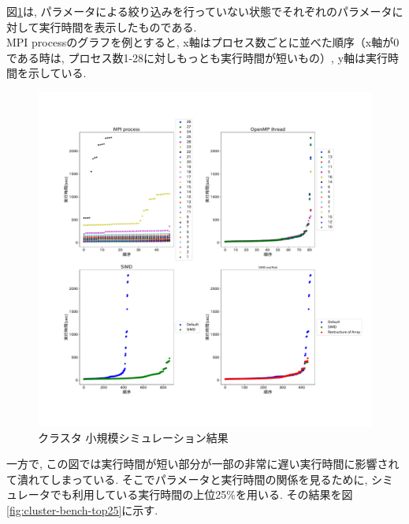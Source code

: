 図\ref{fig:cluster-bench}は, パラメータによる絞り込みを行っていない状態でそれぞれのパラメータに対して実行時間を表示したものである.\\
MPI processのグラフを例とすると, x軸はプロセス数ごとに並べた順序（x軸が0である時は, プロセス数1-28に対しもっとも実行時間が短いもの）,
y軸は実行時間を示している.\\
\begin{figure}[htb]
 \begin{center}
    \includegraphics[width=1.2\textwidth]{./images/cluster-bench.pdf}
    \caption{クラスタ 小規模シミュレーション結果}
    \label{fig:cluster-bench}
 \end{center}
\end{figure}
一方で, この図では実行時間が短い部分が一部の非常に遅い実行時間に影響されて潰れてしまっている.
そこでパラメータと実行時間の関係を見るために, シミュレータでも利用している実行時間の上位25\%を用いる. その結果を図\ref{fig:cluster-bench-top25}に示す.\\
